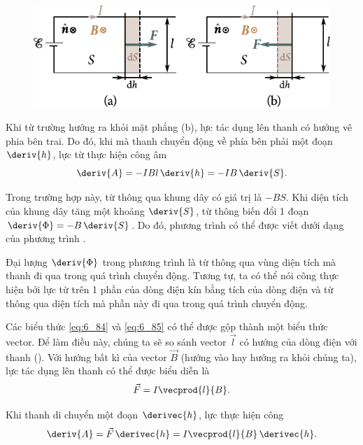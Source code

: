 \begin{figure}[t]
	\begin{center}
		\includegraphics[scale=1.1]{figures/ch_06/fig_6_21.pdf}
		\caption[]{}
		\label{fig:6_21}
	\end{center}
	\vspace{-0.8cm}
\end{figure}

\noindent
Khi từ trường hướng ra khỏi mặt phẳng (b), lực tác dụng lên thanh có hướng vê phia bên trai. Do đó, khi mà thanh chuyển động về phía bên phải một đoạn $\deriv{h}$, lực từ thực hiện công âm \begin{equation}\label{eq:6_86}
    \deriv{A} = - I B l\, \deriv{h} = - I B\, \deriv{S}.
\end{equation}

\noindent
Trong trường hợp này, từ thông qua khung dây có giá trị là $-BS$. Khi diện tích của khung dây tăng một khoảng $\deriv{S}$, từ thông biến đổi 1 đoạn $\deriv{\Phi}=-B\,\deriv{S}$. Do đó, phương trình  có thể được viết dưới dạng của phương trình .

Đại lượng $\deriv{\Phi}$ trong phương trình  là từ thông qua vùng diện tích mà thanh đi qua trong quá trình chuyển động. Tương tự, ta có thể nói công thực hiện bởi lực từ trên 1 phần của dòng điện kín bằng tích của dòng điện và từ thông qua diện tích mà phần này đi qua trong quá trình chuyển động.

Các biểu thức \eqref{eq:6_84} và \eqref{eq:6_85} có thể được gộp thành một biểu thức vector. Để làm điều này, chúng ta sẽ so sánh vector $\vec{l}$ có hướng của dòng điện với thanh (). Với hướng bất kì của vector $\vec{B}$ (hướng vào hay hướng ra khỏi chúng ta), lực tác dụng lên thanh có thể được biểu diễn là
\begin{equation*}
    \vec{F} = I \vecprod{l}{B}.
\end{equation*}

\noindent
Khi thanh di chuyển một đoạn $\derivec{h}$, lực thực hiện công
\begin{equation*}
    \deriv{A} = \vec{F}\, \derivec{h} = I \vecprod{l}{B}\, \derivec{h}.
\end{equation*}

